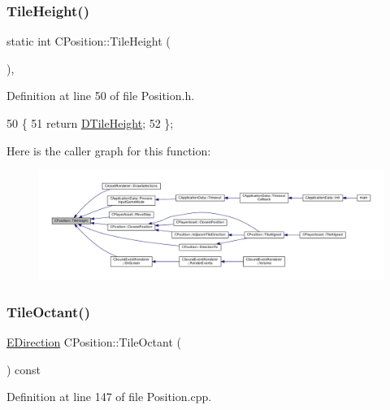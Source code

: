 \subsubsection{\texorpdfstring{Tile\+Height()}{TileHeight()}}
{\footnotesize\ttfamily static int C\+Position\+::\+Tile\+Height (\begin{DoxyParamCaption}{ }\end{DoxyParamCaption})\hspace{0.3cm}{\ttfamily [inline]}, {\ttfamily [static]}}



Definition at line 50 of file Position.\+h.


\begin{DoxyCode}
50                                \{
51             \textcolor{keywordflow}{return} \hyperlink{classCPosition_a202ebb83e86df75cfb76cf1241ba817c}{DTileHeight};  
52         \};
\end{DoxyCode}
Here is the caller graph for this function\+:\nopagebreak
\begin{figure}[H]
\begin{center}
\leavevmode
\includegraphics[width=350pt]{classCPosition_ac4f0edd9c9632f1bdca981ef5d9b71e5_icgraph}
\end{center}
\end{figure}
\hypertarget{classCPosition_a6acbc9445751b0a040c2971720f00088}{}\label{classCPosition_a6acbc9445751b0a040c2971720f00088} 
\subsubsection{\texorpdfstring{Tile\+Octant()}{TileOctant()}}
{\footnotesize\ttfamily \hyperlink{GameDataTypes_8h_acb2b033915f6659a71a38b5aa6e4eb42}{E\+Direction} C\+Position\+::\+Tile\+Octant (\begin{DoxyParamCaption}{ }\end{DoxyParamCaption}) const}



Definition at line 147 of file Position.\+cpp.


